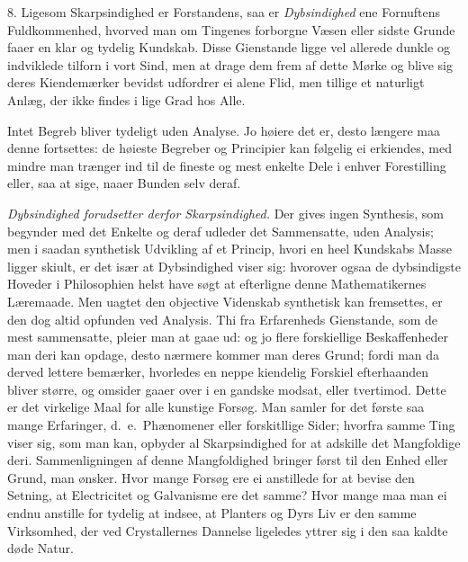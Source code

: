 \documentclass[12pt,a4paper]{article}
\newcommand{\opage}[1]{\marginnote{\footnotesize\textit{[#1]}}}
\begin{document}
8. Ligesom Skarpsindighed er Forstandens, saa er \emph{Dybsindighed} ene Fornuftens
Fuldkommenhed, hvorved man om Tingenes forborgne Væsen eller sidste Grunde faaer en klar
og tydelig Kundskab. Disse Gienstande ligge vel allerede dunkle og indviklede tilforn i
vort Sind, men at drage dem frem af dette Mørke og blive sig deres Kiendemærker bevidst
udfordrer ei alene Flid,
\opage{169} men tillige et naturligt Anlæg, der ikke findes i lige Grad hos Alle.

Intet Begreb bliver tydeligt uden Analyse. Jo høiere det er, desto længere maa denne
fortsettes: de høieste Begreber og Principier kan følgelig ei erkiendes, med mindre man
trænger ind til de fineste og mest enkelte Dele i enhver Forestilling eller, saa at sige,
naaer Bunden selv deraf.

\emph{Dybsindighed forudsetter derfor Skarpsindighed.} Der gives ingen Synthesis, som
begynder med det Enkelte og deraf udleder det Sammensatte, uden Analysis; men i saadan
synthetisk Udvikling af et Princip, hvori en heel Kundskabs Masse ligger skiult, er det
især at Dybsindighed viser sig: hvorover ogsaa de dybsindigste Hoveder i Philosophien
helst have søgt at efterligne denne Mathematikernes Læremaade. Men uagtet den objective
Videnskab synthetisk kan fremsettes, er den dog altid opfunden ved Analysis. Thi fra
Erfarenheds Gienstande, som de mest sammensatte, pleier man at gaae ud: og jo flere
forskiellige Beskaffenheder man deri kan opdage, desto nærmere kommer man deres Grund;
fordi man da derved lettere bemærker, hvorledes en neppe kiendelig Forskiel efterhaanden
bliver større, og omsider gaaer over i en gandske modsat, eller tvertimod. Dette er det
virkelige Maal for alle kunstige Forsøg. Man samler for det første saa mange Erfaringer,
d.~e.\ Phænomener eller forskitllige Sider; hvorfra samme Ting
\opage{170} viser sig, som man kan, opbyder al Skarpsindighed for at adskille det Mangfoldige deri.
Sammenligningen af denne Mangfoldighed bringer først til den Enhed eller Grund, man
ønsker. Hvor mange Forsøg ere ei anstillede for at bevise den Setning, at Electricitet og
Galvanisme ere det samme? Hvor mange maa man ei endnu anstille for tydelig at indsee, at
Planters og Dyrs Liv er den samme Virksomhed, der ved Crystallernes Dannelse ligeledes
yttrer sig i den saa kaldte døde Natur.
\end{document}
